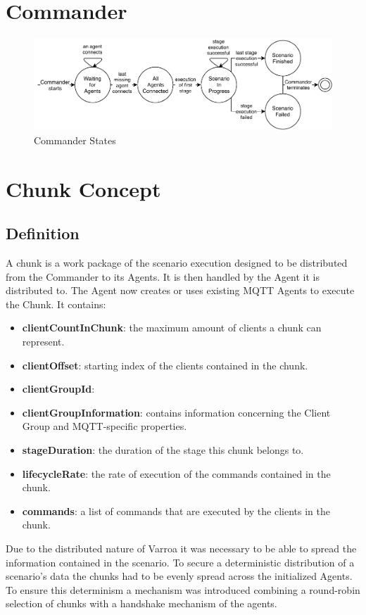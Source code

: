 \section{Commander}
\begin{figure}[h]
	\begin{center}
	\includegraphics[scale=1]{Resources/PDF/CommanderStates}
	\caption{Commander States}
	\label{pic:CommanderStates}
	\end{center}
\end{figure}

\section{Chunk Concept}
\subsection{Definition}
A chunk is a work package of the scenario execution designed to be distributed from the Commander to its Agents.
It is then handled by the Agent it is distributed to.
The Agent now creates or uses existing MQTT Agents to execute the Chunk.
It contains:
\begin{itemize}
	\item \textbf{clientCountInChunk}: the maximum amount of clients a chunk can represent.
	\item \textbf{clientOffset}: starting index of the clients contained in the chunk.
	\item \textbf{clientGroupId}: 
	\item \textbf{clientGroupInformation}: contains information concerning the Client Group and MQTT-specific properties.
	\item \textbf{stageDuration}: the duration of the stage this chunk belongs to.
	\item \textbf{lifecycleRate}: the rate of execution of the commands contained in the chunk.
	\item \textbf{commands}: a list of commands that are executed by the clients in the chunk.
\end{itemize}
Due to the distributed nature of Varroa it was necessary to be able to spread the information contained in the scenario.
To secure a deterministic distribution of a scenario's data the chunks had to be evenly spread across the initialized Agents.
To ensure this determinism a mechanism was introduced combining a round-robin selection of chunks with a handshake mechanism of the agents.



